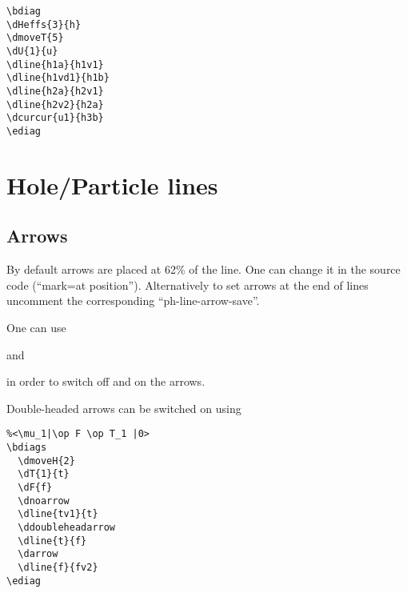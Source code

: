 \documentclass[a4paper]{article}
\newcommand{\myind}{\hspace{10pt}}
\begin{document}
 \begin{minipage}[b]{0.5\linewidth}\centering
  \begin{lstlisting}
\bdiag
\dHeffs{3}{h}
\dmoveT{5}
\dU{1}{u}
\dline{h1a}{h1v1}
\dline{h1vd1}{h1b}
\dline{h2a}{h2v1}
\dline{h2v2}{h2a}
\dcurcur{u1}{h3b}
\ediag
  \end{lstlisting}
 \end{minipage}
 \begin{minipage}[b]{0.5\linewidth}\centering
\bdiag
{}
\ediag
 \end{minipage}

\section{Hole/Particle lines}

\subsection{Arrows}

By default arrows are placed at 62\% of the line. One can change it in the source code 
(``mark=at position'').
Alternatively to set arrows at the end of lines uncomment the corresponding ``ph-line-arrow-save''.

One can use 

\myind{\bf \textbackslash dnoarrow}

and

\myind{\bf \textbackslash darrow}

in order to switch off and on the arrows.

Double-headed arrows can be switched on using 

\myind{\bf \textbackslash ddoubleheadarrow}

 \begin{minipage}[b]{0.5\linewidth}\centering
  \begin{lstlisting}
%<\mu_1|\op F \op T_1 |0>
\bdiags
  \dmoveH{2}
  \dT{1}{t}
  \dF{f}
  \dnoarrow
  \dline{tv1}{t}
  \ddoubleheadarrow
  \dline{t}{f}
  \darrow
  \dline{f}{fv2}
\ediag 
  \end{lstlisting}
 \end{minipage}
 \begin{minipage}[b]{0.5\linewidth}\centering
    \bdiags
    \dnoarrow
    \ddoubleheadarrow
    \darrow
    \ediag
 \end{minipage}
\end{document}
